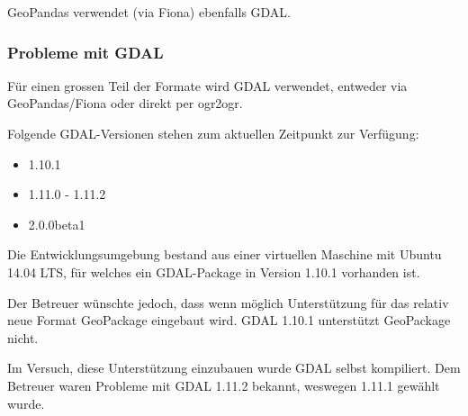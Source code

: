 
GeoPandas verwendet (via Fiona) ebenfalls GDAL.

\subsubsection{Probleme mit GDAL}\label{sec:pd:format-gdal-problems}
Für einen grossen Teil der Formate wird GDAL verwendet, entweder via GeoPandas/Fiona oder direkt per ogr2ogr. 

Folgende GDAL-Versionen stehen zum aktuellen Zeitpunkt zur Verfügung:
\begin{itemize}
\item 1.10.1
\item 1.11.0 - 1.11.2
\item 2.0.0beta1
\end{itemize}

Die Entwicklungsumgebung bestand aus einer virtuellen Maschine mit Ubuntu 14.04 LTS, für welches ein GDAL-Package in Version 1.10.1 vorhanden ist. 

Der Betreuer wünschte jedoch, dass wenn möglich Unterstützung für das relativ neue Format GeoPackage eingebaut wird. GDAL 1.10.1 unterstützt GeoPackage nicht.

Im Versuch, diese Unterstützung einzubauen wurde GDAL selbst kompiliert. Dem Betreuer waren Probleme mit GDAL 1.11.2 bekannt, weswegen 1.11.1 gewählt wurde.


